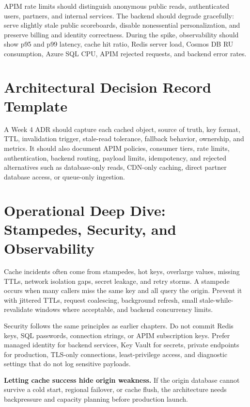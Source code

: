 APIM rate limits should distinguish anonymous public reads, authenticated users, partners, and internal services. The backend should degrade gracefully: serve slightly stale public scoreboards, disable nonessential personalization, and preserve billing and identity correctness. During the spike, observability should show p95 and p99 latency, cache hit ratio, Redis server load, Cosmos DB RU consumption, Azure SQL CPU, APIM rejected requests, and backend error rates.

\section{Architectural Decision Record Template}
A Week 4 ADR should capture each cached object, source of truth, key format, TTL, invalidation trigger, stale-read tolerance, fallback behavior, ownership, and metrics. It should also document APIM policies, consumer tiers, rate limits, authentication, backend routing, payload limits, idempotency, and rejected alternatives such as database-only reads, CDN-only caching, direct partner database access, or queue-only ingestion.

\section{Operational Deep Dive: Stampedes, Security, and Observability}
Cache incidents often come from stampedes, hot keys, overlarge values, missing TTLs, network isolation gaps, secret leakage, and retry storms. A stampede occurs when many callers miss the same key and all query the origin. Prevent it with jittered TTLs, request coalescing, background refresh, small stale-while-revalidate windows where acceptable, and backend concurrency limits.

Security follows the same principles as earlier chapters. Do not commit Redis keys, SQL passwords, connection strings, or APIM subscription keys. Prefer managed identity for backend services, Key Vault for secrets, private endpoints for production, TLS-only connections, least-privilege access, and diagnostic settings that do not log sensitive payloads.

\begin{pitfall}
\textbf{Letting cache success hide origin weakness.} If the origin database cannot survive a cold start, regional failover, or cache flush, the architecture needs backpressure and capacity planning before production launch.
\end{pitfall}

